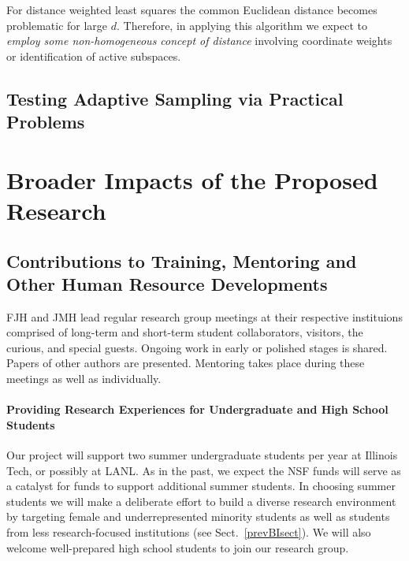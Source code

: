 \documentclass[11pt]{NSFamsart}
\begin{document}
For distance weighted least squares the common Euclidean distance becomes problematic for large $d$.  Therefore, in applying this algorithm we expect to \emph{employ some non-homogeneous concept of distance} involving coordinate weights or identification of active subspaces.


\subsection{Testing Adaptive Sampling via Practical Problems} \label{sec:TestBed}



\section{Broader Impacts of the Proposed Research}\label{SectBroad}


\subsection{Contributions to Training, Mentoring and Other Human Resource Developments}
FJH and JMH lead regular research group meetings at their respective instituions comprised of long-term and short-term student 
collaborators, visitors, the curious, and special guests.  Ongoing work in early or polished stages is shared.  Papers of other authors are presented.  Mentoring takes place during these meetings as well as individually.

\paragraph*{Providing Research Experiences for Undergraduate and High School Students} 
Our project will support two summer undergraduate students per year at Illinois Tech, or possibly at LANL. As in the past, we expect the NSF funds will serve as a catalyst for funds to 
support additional summer students. In choosing summer students we will make a deliberate effort to 
build 
a diverse research environment by targeting female and underrepresented minority students as well 
as students from less research-focused institutions (see Sect.~\ref{prevBIsect}). We will also 
welcome well-prepared high school students to join our research group.
\end{document}
